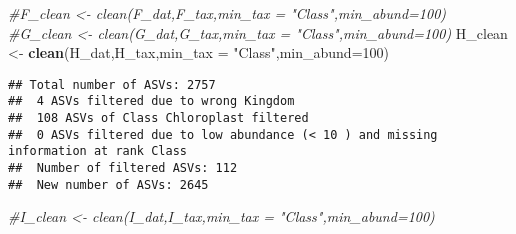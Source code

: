 \documentclass[
]{article}
\newenvironment{Shaded}{\begin{snugshade}}{\end{snugshade}}
\newcommand{\CommentTok}[1]{\textcolor[rgb]{0.56,0.35,0.01}{\textit{#1}}}
\newcommand{\DataTypeTok}[1]{\textcolor[rgb]{0.13,0.29,0.53}{#1}}
\newcommand{\DecValTok}[1]{\textcolor[rgb]{0.00,0.00,0.81}{#1}}
\newcommand{\KeywordTok}[1]{\textcolor[rgb]{0.13,0.29,0.53}{\textbf{#1}}}
\newcommand{\NormalTok}[1]{#1}
\newcommand{\StringTok}[1]{\textcolor[rgb]{0.31,0.60,0.02}{#1}}
\begin{document}
\begin{Shaded}
\begin{Highlighting}[]
\CommentTok{#F_clean <- clean(F_dat,F_tax,min_tax = "Class",min_abund=100)}
\CommentTok{#G_clean <- clean(G_dat,G_tax,min_tax = "Class",min_abund=100)}
\NormalTok{H_clean <-}\StringTok{ }\KeywordTok{clean}\NormalTok{(H_dat,H_tax,}\DataTypeTok{min_tax =} \StringTok{"Class"}\NormalTok{,}\DataTypeTok{min_abund=}\DecValTok{100}\NormalTok{)}
\end{Highlighting}
\end{Shaded}

\begin{verbatim}
## Total number of ASVs: 2757 
##  4 ASVs filtered due to wrong Kingdom
##  108 ASVs of Class Chloroplast filtered
##  0 ASVs filtered due to low abundance (< 10 ) and missing information at rank Class 
##  Number of filtered ASVs: 112 
##  New number of ASVs: 2645
\end{verbatim}

\begin{Shaded}
\begin{Highlighting}[]
\CommentTok{#I_clean <- clean(I_dat,I_tax,min_tax = "Class",min_abund=100)}
\end{Highlighting}
\end{Shaded}
\end{document}
